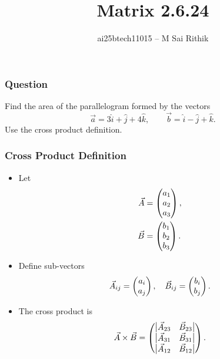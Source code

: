 \documentclass{beamer}
\title{Matrix 2.6.24}
\author{ai25btech11015 -- M Sai Rithik}
\date{}
\begin{document}
\maketitle

\begin{frame}
\frametitle{Question}
Find the area of the parallelogram formed by the vectors
\[
\Vec{a} = 3\hat{i} + \hat{j} + 4\hat{k}, \qquad
\Vec{b} = \hat{i} - \hat{j} + \hat{k}.
\]
Use the cross product definition.
\end{frame}

\begin{frame}
\frametitle{Cross Product Definition}
\begin{itemize}
\item Let
\begin{align}
\Vec{A} &= \begin{pmatrix}a_1 \\ a_2 \\ a_3\end{pmatrix}, \\
\Vec{B} &= \begin{pmatrix}b_1 \\ b_2 \\ b_3\end{pmatrix}.
\end{align}

\item Define sub-vectors
\begin{align}
\Vec{A}_{ij} = \begin{pmatrix}a_i \\ a_j\end{pmatrix}, \quad
\Vec{B}_{ij} = \begin{pmatrix}b_i \\ b_j\end{pmatrix}.
\end{align}

\item The cross product is
\begin{align}
\Vec{A}\times\Vec{B} =
\begin{pmatrix}
  \begin{vmatrix}\Vec{A}_{23} & \Vec{B}_{23}\end{vmatrix} \\
  \begin{vmatrix}\Vec{A}_{31} & \Vec{B}_{31}\end{vmatrix} \\
  \begin{vmatrix}\Vec{A}_{12} & \Vec{B}_{12}\end{vmatrix}
\end{pmatrix}.
\end{align}
\end{itemize}
\end{frame}
\end{document}
